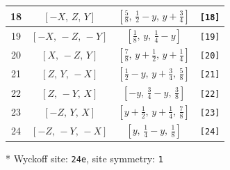 \documentclass[fleqn,8pt]{jsarticle}
\begin{document}
\begin{longtable}{cccc}
18 & $\left[ - X,\, Z,\, Y \right]$ & $\left[ \frac{5}{8},\, \frac{1}{2} - y,\, y + \frac{3}{4} \right]$ & {\tt [18]} \\ \hline
19 & $\left[ - X,\, - Z,\, - Y \right]$ & $\left[ \frac{1}{8},\, y,\, \frac{1}{4} - y \right]$ & {\tt [19]} \\ \hline
20 & $\left[ X,\, - Z,\, Y \right]$ & $\left[ \frac{7}{8},\, y + \frac{1}{2},\, y + \frac{1}{4} \right]$ & {\tt [20]} \\ \hline
21 & $\left[ Z,\, Y,\, - X \right]$ & $\left[ \frac{1}{2} - y,\, y + \frac{3}{4},\, \frac{5}{8} \right]$ & {\tt [21]} \\ \hline
22 & $\left[ Z,\, - Y,\, X \right]$ & $\left[ - y,\, \frac{3}{4} - y,\, \frac{3}{8} \right]$ & {\tt [22]} \\ \hline
23 & $\left[ - Z,\, Y,\, X \right]$ & $\left[ y + \frac{1}{2},\, y + \frac{1}{4},\, \frac{7}{8} \right]$ & {\tt [23]} \\ \hline
24 & $\left[ - Z,\, - Y,\, - X \right]$ & $\left[ y,\, \frac{1}{4} - y,\, \frac{1}{8} \right]$ & {\tt [24]} \\
\end{longtable}
* Wyckoff site: {\tt 24e}, site symmetry: {\tt 1}
\renewcommand{\arraystretch}{1.2}
\end{document}
